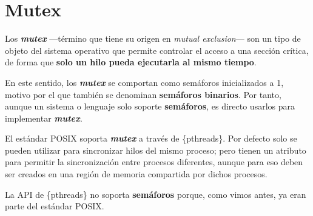 \section{Mutex}\label{_mutex}

Los \textbf{\emph{{}mutex}} ---término que tiene su origen en
\emph{mutual exclusion}--- son un tipo de objeto del sistema operativo
que permite controlar el acceso a una sección crítica, de forma que
\textbf{solo un hilo pueda ejecutarla al mismo tiempo}.

En este sentido, los \textbf{\emph{mutex}} se comportan como semáforos
inicializados a 1, motivo por el que también se denominan
\textbf{semáforos binarios}{}. Por tanto, aunque un sistema o lenguaje
solo soporte \textbf{semáforos}, es directo usarlos para implementar
\textbf{\emph{mutex}}.

El estándar POSIX soporta \textbf{\emph{mutex}} a través de
\{pthreads\}. Por defecto solo se pueden utilizar para sincronizar hilos
del mismo proceso; pero tienen un atributo para permitir la
sincronización entre procesos diferentes, aunque para eso deben ser
creados en una región de memoria compartida por dichos procesos.

La API de \{pthreads\} no soporta \textbf{semáforos} porque, como vimos
antes, ya eran parte del estándar POSIX.

